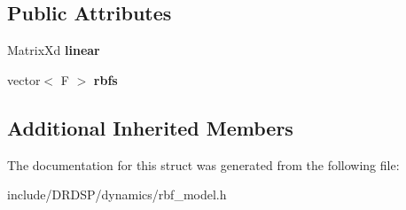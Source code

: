\subsection*{Public Attributes}
\begin{DoxyCompactItemize}
\item 
\hypertarget{struct_d_r_d_s_p_1_1_r_b_f_model_ac51e09cfe2835c579311b1e6af4d6bd5}{Matrix\-Xd {\bfseries linear}}\label{struct_d_r_d_s_p_1_1_r_b_f_model_ac51e09cfe2835c579311b1e6af4d6bd5}

\item 
\hypertarget{struct_d_r_d_s_p_1_1_r_b_f_model_a79107ccb3e081e36771f6b6f3dad0130}{vector$<$ F $>$ {\bfseries rbfs}}\label{struct_d_r_d_s_p_1_1_r_b_f_model_a79107ccb3e081e36771f6b6f3dad0130}

\end{DoxyCompactItemize}
\subsection*{Additional Inherited Members}


The documentation for this struct was generated from the following file\-:\begin{DoxyCompactItemize}
\item 
include/\-D\-R\-D\-S\-P/dynamics/rbf\-\_\-model.\-h\end{DoxyCompactItemize}
